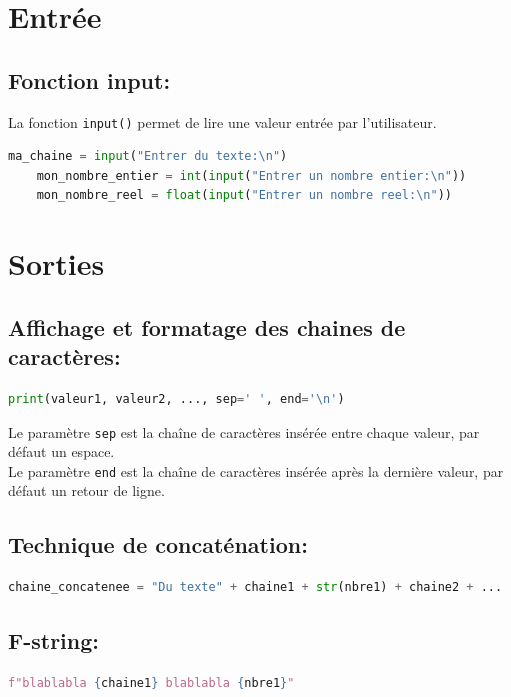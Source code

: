 \documentclass[a4paper,12pt,twoside]{article}
\begin{document}
    \section*{Entrée}
    \subsection*{Fonction input:}
    La fonction \texttt{input()} permet de lire une valeur entrée par l'utilisateur.
    \begin{lstlisting}[language=Python]
    ma_chaine = input("Entrer du texte:\n")
    mon_nombre_entier = int(input("Entrer un nombre entier:\n"))
    mon_nombre_reel = float(input("Entrer un nombre reel:\n"))
    \end{lstlisting}

    \section*{Sorties}
    \subsection*{Affichage et formatage des chaines de caractères:}
    \begin{lstlisting}[language=Python]
    print(valeur1, valeur2, ..., sep=' ', end='\n')
    \end{lstlisting}
    Le paramètre \texttt{sep} est la chaîne de caractères insérée entre chaque
    valeur, par défaut un espace.\\
    Le paramètre \texttt{end} est la chaîne de caractères insérée après la
    dernière valeur, par défaut un retour de ligne.

    \subsection*{Technique de concaténation:}
    \begin{lstlisting}[language=Python]
    chaine_concatenee = "Du texte" + chaine1 + str(nbre1) + chaine2 + ...
    \end{lstlisting} 

    \subsection*{F-string:}
    \begin{lstlisting}[language=Python]
    f"blablabla {chaine1} blablabla {nbre1}"
    \end{lstlisting} 
    \newpage
\end{document}
